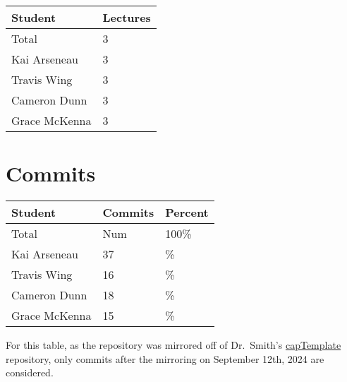 \documentclass{article}
\begin{document}
\begin{table}[H]
\centering
\begin{tabular}{ll}
\toprule
\textbf{Student} & \textbf{Lectures}\\
\midrule
Total & 3\\
Kai Arseneau & 3\\
Travis Wing & 3\\
Cameron Dunn & 3\\
Grace McKenna & 3\\
\bottomrule
\end{tabular}
\end{table}


\section{Commits}


\begin{table}[H]
\centering
\begin{tabular}{lll}
\toprule
\textbf{Student} & \textbf{Commits} & \textbf{Percent}\\
\midrule
Total & Num & 100\% \\
Kai Arseneau & 37 & \% \\
Travis Wing & 16 & \% \\
Cameron Dunn & 18 & \% \\
Grace McKenna & 15 & \% \\
\bottomrule
\end{tabular}
\end{table}

For this table, as the repository was mirrored off of Dr.~Smith's \href{https://github.com/smiths/capTemplate}{capTemplate} repository, only commits after the mirroring on September 12th, 2024 are considered.
\end{document}
